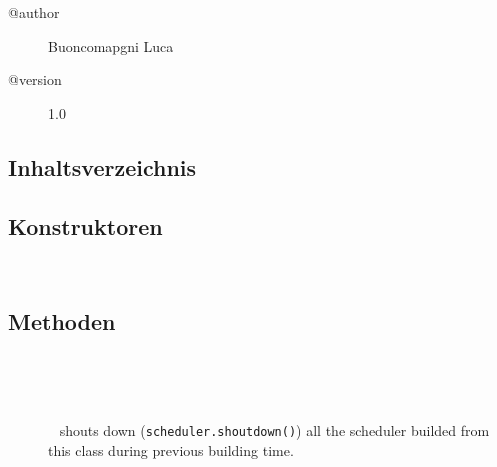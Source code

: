 \begin{description}
\item[@author] 
Buoncomapgni Luca
\item[@version] 
1.0
\end{description}
\subsection{Inhaltsverzeichnis}
\subsection{Konstruktoren}
\begin{description}
\item[{\label{ontologyFramework.OFProcedureManagment.OFSchedulingBuilder()}}]
~ 
\end{description}
\subsection{Methoden}
\begin{description}
\item[{\label{ontologyFramework.OFProcedureManagment.OFSchedulingBuilder.buildInfo(java.lang.String[],ontologyFramework.OFContextManagement.OWLReferences,ontologyFramework.OFRunning.OFInvokingManager.OFBuildedListInvoker)}}]
~ 
\item[{\label{ontologyFramework.OFProcedureManagment.OFSchedulingBuilder.getInitialisedClasses()}}]
~ 
\item[{\label{ontologyFramework.OFProcedureManagment.OFSchedulingBuilder.shotDownAllScheduler()}}]
~ shouts down (\verb!scheduler.shoutdown()!) all the scheduler builded from
 this class during previous building time.
\end{description}
